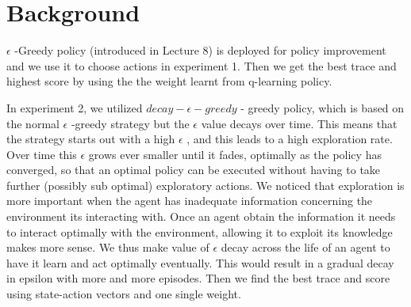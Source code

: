 \section{Background}
$\epsilon$
-Greedy policy (introduced in Lecture 8) is deployed for policy improvement and we use it to choose actions in experiment 1. Then we get the best trace and highest score by using the the weight learnt from q-learning policy.

In experiment 2, we utilized
$decay-\epsilon-greedy$
- greedy policy, which is based on the normal
$\epsilon$
-greedy strategy but the 
$\epsilon$
value decays over time. This
means that the strategy starts out with a high 
$\epsilon$
, and this leads to a high exploration rate. 
Over time this
$\epsilon$
grows ever smaller until it fades, optimally as the policy has converged, so that an optimal policy can be executed
without having to take further (possibly sub optimal) exploratory actions. We noticed that exploration is more important when the agent has inadequate information concerning the environment its interacting with. Once an agent obtain the information it needs to interact optimally with the environment, allowing it to exploit its knowledge makes more sense. We thus make value of 
$\epsilon$
decay across the life of an agent to have it learn and act optimally eventually. This would result in a gradual decay in epsilon with more and more episodes. Then we find the best trace and score using state-action vectors and one single weight.

